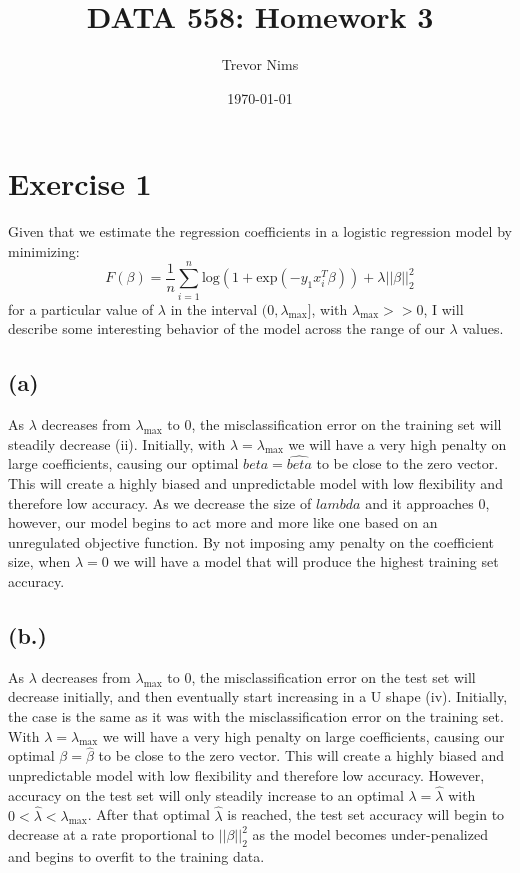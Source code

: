 \documentclass{article}
\title{DATA 558: Homework 3}
\author{Trevor Nims}
\date\today
\begin{document}
\maketitle

\section*{Exercise 1}
Given that we estimate the regression coefficients in a logistic regression model by minimizing:
$$F(\beta) = \frac{1}{n}\sum_{i=1}^{n}\text{log}(1+\text{exp}(-y_1x_i^T\beta))+\lambda||\beta||_2^2$$
for a particular value of $\lambda$ in the interval $(0, \lambda_{\text{max}}]$, with $\lambda_{\text{max}} >> 0$, I will 
describe some interesting behavior of the model across the range of our $\lambda$ values.

\subsection*{(a)} 
As $\lambda$ decreases from $\lambda_{\text{max}}$ to 0, the misclassification error on the training set will steadily decrease (ii). Initially, with $\lambda = \lambda_{\text{max}}$ we will have a very high penalty on large coefficients, causing our optimal $beta = \hat{beta}$ to be close to the zero vector. This will create a highly biased and unpredictable model with low flexibility and therefore low accuracy. As we decrease the size of $lambda$ and it approaches 0, however, our model begins to act more and more like  one based on an unregulated objective function. By not imposing amy penalty on the coefficient size, when $\lambda = 0$ we will have a model that will produce the highest training set accuracy.

\subsection*{(b.)}
As $\lambda$ decreases from $\lambda_{\text{max}}$ to 0, the misclassification error on the test set will decrease initially, and then eventually start increasing in a U shape (iv). Initially, the case is the same as it was with the misclassification error on the training set.  With $\lambda = \lambda_{\text{max}}$ we will have a very high penalty on large coefficients, causing our optimal $\beta = \hat{\beta}$ to be close to the zero vector. This will create a highly biased and unpredictable model with low flexibility and therefore low accuracy. However, accuracy on the test set will only steadily increase  to an optimal $\lambda = \hat{\lambda}$ with $0 < \hat{\lambda} < \lambda_{\text{max}}$. After that optimal $\hat{\lambda}$ is reached, the test set accuracy will begin to decrease at a rate proportional to $||\beta||_2^2$ as the model becomes under-penalized and begins to overfit to the training data.
\end{document}
